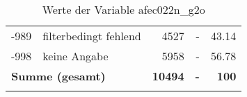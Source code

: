\begin{longtable}{Xlrrr}
       -989 & filterbedingt fehlend & \num{4527} & - & \num[round-mode=places,round-precision=2]{43.14} \\

       -998 & keine Angabe & \num{5958} & - & \num[round-mode=places,round-precision=2]{56.78} \\

     \midrule
     \multicolumn{2}{l}{\textbf{Summe (gesamt)}} & \textbf{\num{10494}} & \textbf{-} & \textbf{\num{100}} \\
     \bottomrule
     \caption{Werte der Variable afec022n\_g2o}
     \end{longtable}
     
